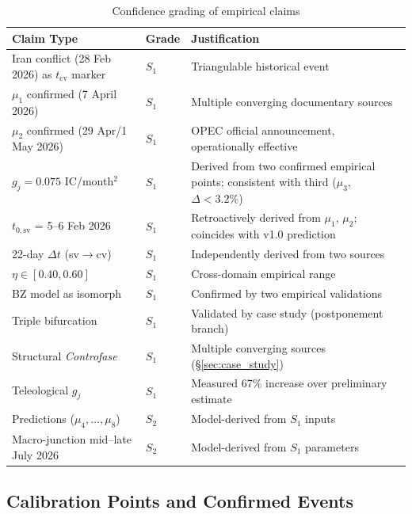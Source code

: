\documentclass[12pt,a4paper]{article}
\newcommand{\gj}{g_j}
\begin{document}
\begin{table}[H]
\centering
\caption{Confidence grading of empirical claims}
\label{tab:svp_grading}
\begin{tabularx}{\textwidth}{@{}p{4.2cm}lX@{}}
\toprule
\textbf{Claim Type} & \textbf{Grade} & \textbf{Justification} \\
\midrule
Iran conflict (28 Feb 2026) as $t_{\mathrm{cv}}$ marker & $S_1$ & Triangulable historical event \\
$\mu_1$ confirmed (7 April 2026) & $S_1$ & Multiple converging documentary sources \\
$\mu_2$ confirmed (29 Apr/1 May 2026) & $S_1$ & OPEC official announcement, operationally effective \\
$\gj = 0.075$ IC/month$^2$ & $S_1$ & Derived from two confirmed empirical points; consistent with third ($\mu_3$, $\Delta < 3.2\%$) \\
$t_{0,\mathrm{sv}}$ = 5--6 Feb 2026 & $S_1$ & Retroactively derived from $\mu_1$, $\mu_2$; coincides with v1.0 prediction \\
22-day $\Delta t$ (sv$\to$cv) & $S_1$ & Independently derived from two sources \\
$\eta \in [0.40, 0.60]$ & $S_1$ & Cross-domain empirical range \\
BZ model as isomorph & $S_1$ & Confirmed by two empirical validations \\
Triple bifurcation & $S_1$ & Validated by case study (postponement branch) \\
Structural \textit{Controfase} & $S_1$ & Multiple converging sources (\S\ref{sec:case_study}) \\
Teleological $\gj$ & $S_1$ & Measured 67\% increase over preliminary estimate \\
Predictions ($\mu_4, \ldots, \mu_8$) & $S_2$ & Model-derived from $S_1$ inputs \\
Macro-junction mid--late July 2026 & $S_2$ & Model-derived from $S_1$ parameters \\
\bottomrule
\end{tabularx}
\end{table}

\subsection{Calibration Points and Confirmed Events}
\end{document}
